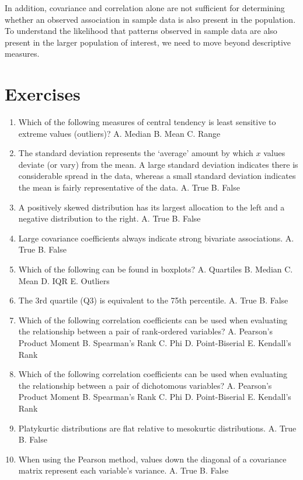 \documentclass[]{book}
\begin{document}
In addition, covariance and correlation alone are not sufficient for determining whether an observed association in sample data is also present in the population. To understand the likelihood that patterns observed in sample data are also present in the larger population of interest, we need to move beyond descriptive measures.

\hypertarget{exercises-2}{%
\section{Exercises}\label{exercises-2}}

\begin{enumerate}
\def\labelenumi{\arabic{enumi}.}
\item
  Which of the following measures of central tendency is least sensitive to extreme values (outliers)?
  A. Median
  B. Mean
  C. Range
\item
  The standard deviation represents the `average' amount by which \(x\) values deviate (or vary) from the mean. A large standard deviation indicates there is considerable spread in the data, whereas a small standard deviation indicates the mean is fairly representative of the data.
  A. True
  B. False
\item
  A positively skewed distribution has its largest allocation to the left and a negative distribution to the right.
  A. True
  B. False
\item
  Large covariance coefficients always indicate strong bivariate associations.
  A. True
  B. False
\item
  Which of the following can be found in boxplots?
  A. Quartiles
  B. Median
  C. Mean
  D. IQR
  E. Outliers
\item
  The 3rd quartile (Q3) is equivalent to the 75th percentile.
  A. True
  B. False
\item
  Which of the following correlation coefficients can be used when evaluating the relationship between a pair of rank-ordered variables?
  A. Pearson's Product Moment
  B. Spearman's Rank
  C. Phi
  D. Point-Biserial
  E. Kendall's Rank
\item
  Which of the following correlation coefficients can be used when evaluating the relationship between a pair of dichotomous variables?
  A. Pearson's Product Moment
  B. Spearman's Rank
  C. Phi
  D. Point-Biserial
  E. Kendall's Rank
\item
  Platykurtic distributions are flat relative to mesokurtic distributions.
  A. True
  B. False
\item
  When using the Pearson method, values down the diagonal of a covariance matrix represent each variable's variance.
  A. True
  B. False
\end{enumerate}
\end{document}
